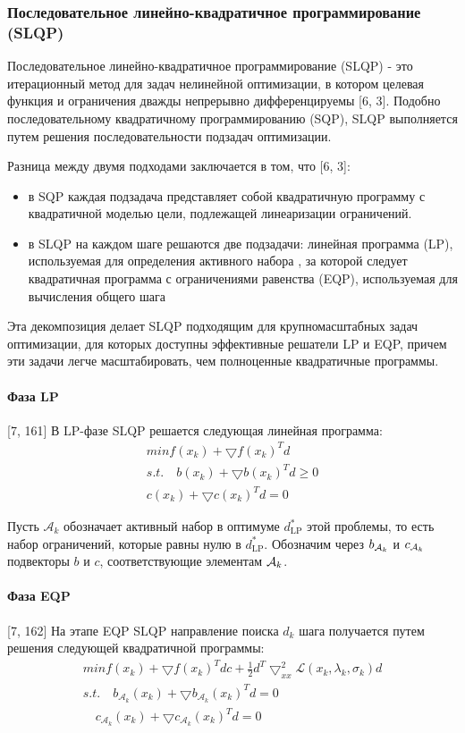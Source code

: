 \documentclass[12pt,a4paper]{article}
\begin{document}
\subsubsection{Последовательное линейно-квадратичное программирование (SLQP)}
Последовательное линейно-квадратичное программирование (SLQP) - это итерационный метод для задач нелинейной оптимизации, в котором целевая функция и ограничения дважды непрерывно дифференцируемы [6, 3]. Подобно последовательному квадратичному программированию (SQP), SLQP выполняется путем решения последовательности подзадач оптимизации. 

Разница между двумя подходами заключается в том, что [6, 3]:
\begin{itemize}
	\item в SQP каждая подзадача представляет собой квадратичную программу с квадратичной моделью цели, подлежащей линеаризации ограничений.
	\item в SLQP на каждом шаге решаются две подзадачи: линейная программа (LP), используемая для определения активного набора , за которой следует квадратичная программа с ограничениями равенства (EQP), используемая для вычисления общего шага
\end{itemize}

Эта декомпозиция делает SLQP подходящим для крупномасштабных задач оптимизации, для которых доступны эффективные решатели LP и EQP, причем эти задачи легче масштабировать, чем полноценные квадратичные программы.

\paragraph{Фаза LP}[7, 161]
В LP-фазе SLQP решается следующая линейная программа:
\begin{align*}
	min f(x_k) + \bigtriangledown f(x_k)^Td \\
	s.t. \quad b(x_k) + \bigtriangledown b(x_k)^Td \geq 0 \\
	c(x_k) + \bigtriangledown c(x_k)^Td=0
\end{align*}

Пусть $\mathcal{A}_{k}$ обозначает активный набор в оптимуме $ d_{\text{LP}}^{*}$ этой проблемы, то есть набор ограничений, которые равны нулю в $d_{\text{LP}}^{*}$. Обозначим через $b_{{\cal{A}}_{k}}$ и $c_{{\cal{A}}_{k}}$ подвекторы $b$ и $c$, соответствующие элементам ${\cal{A}}_{k}$.

\paragraph{Фаза EQP}[7, 162]
На этапе EQP SLQP направление поиска $d_{k}$ шага получается путем решения следующей квадратичной программы:
\begin{align*}
	min f(x_k) + \bigtriangledown f(x_k)^Tdc+ \frac{1}{2}d^T \bigtriangledown_{xx}^{2}{\mathcal{L}}(x_k, \lambda_k, \sigma_k)d\\
	s.t. \quad b_{\mathcal{A}_k}(x_k) + \bigtriangledown  b_{\mathcal{A}_k}(x_k)^Td = 0\\
	  \quad c_{\mathcal{A}_k}(x_k) + \bigtriangledown  c_{\mathcal{A}_k}(x_k)^Td=0
\end{align*}
\end{document}
